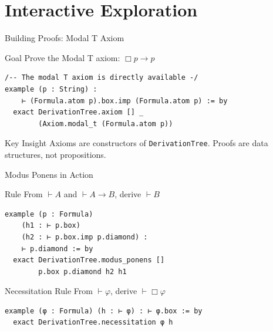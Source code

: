 \documentclass[aspectratio=169,11pt]{beamer}
\newcommand{\nec}{\Box}
\newcommand{\proves}{\vdash}
\newcommand{\imp}{\rightarrow}
\begin{document}

\section{Interactive Exploration}

\begin{frame}[fragile]{Building Proofs: Modal T Axiom}

\begin{block}{Goal}
Prove the Modal T axiom: $\nec p \imp p$
\end{block}

\begin{lstlisting}
/-- The modal T axiom is directly available -/
example (p : String) :
    ⊢ (Formula.atom p).box.imp (Formula.atom p) := by
  exact DerivationTree.axiom [] _
        (Axiom.modal_t (Formula.atom p))
\end{lstlisting}

\vspace{0.3cm}

\begin{alertblock}{Key Insight}
Axioms are constructors of \texttt{DerivationTree}.
Proofs are data structures, not propositions.
\end{alertblock}

\end{frame}

\begin{frame}[fragile]{Modus Ponens in Action}

\begin{block}{Rule}
From $\proves A$ and $\proves A \imp B$, derive $\proves B$
\end{block}

\begin{lstlisting}
example (p : Formula)
    (h1 : ⊢ p.box)
    (h2 : ⊢ p.box.imp p.diamond) :
    ⊢ p.diamond := by
  exact DerivationTree.modus_ponens []
        p.box p.diamond h2 h1
\end{lstlisting}

\vspace{0.3cm}

\begin{block}{Necessitation Rule}
From $\proves \varphi$, derive $\proves \nec\varphi$
\end{block}

\begin{lstlisting}
example (φ : Formula) (h : ⊢ φ) : ⊢ φ.box := by
  exact DerivationTree.necessitation φ h
\end{lstlisting}

\end{frame}
\end{document}
